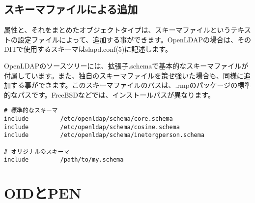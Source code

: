 \subsection{スキーマファイルによる追加}

属性と、それをまとめたオブジェクトタイプは、スキーマファイルというテキストの設定ファイルによって、追加する事ができます。OpenLDAPの場合は、そのDITで使用するスキーマはslapd.conf(5)に記述します。

OpenLDAPのソースツリーには、拡張子.schemaで基本的なスキーマファイルが付属しています。また、独自のスキーマファイルを策せ強いた場合も、同様に追加する事ができます。このスキーマファイルのパスは、.rmpのパッケージの標準的なパスです。FreeBSDなどでは、インストールパスが異なります。

\begin{verbatim}
# 標準的なスキーマ
include         /etc/openldap/schema/core.schema
include         /etc/openldap/schema/cosine.schema
include         /etc/openldap/schema/inetorgperson.schema

# オリジナルのスキーマ
include         /path/to/my.schema
\end{verbatim}

\section{OIDとPEN}